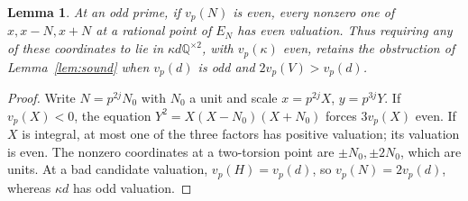 \documentclass[11pt]{article}
\newcommand{\Q}{\mathbb Q}
\newcommand{\vp}{v_p}
\newtheorem{lemma}[theorem]{Lemma}
\theoremstyle{remark}\newtheorem{remark}[theorem]{Remark}
\begin{document}
\begin{lemma}\label{lem:shifts}
At an odd prime, if \(\vp(N)\) is even, every nonzero one of
\(x,x-N,x+N\) at a rational point of \(E_N\) has even valuation.
Thus requiring any of these coordinates to lie in
\(\kappa d\Q^{\times2}\), with \(\vp(\kappa)\) even, retains the
obstruction of Lemma~\ref{lem:sound} when \(\vp(d)\) is odd and \(2\vp(V)>\vp(d)\).
\end{lemma}
\begin{proof}
Write \(N=p^{2j}N_0\) with \(N_0\) a unit and scale
\(x=p^{2j}X\), \(y=p^{3j}Y\). If \(\vp(X)<0\), the equation
\(Y^2=X(X-N_0)(X+N_0)\) forces \(3\vp(X)\) even.
If \(X\) is integral, at most one of the three factors has positive
valuation; its valuation is even. The nonzero coordinates at a
 two-torsion point are \(\pm N_0,\pm2N_0\), which are units.
At a bad candidate valuation, \(\vp(H)=\vp(d)\), so
\(\vp(N)=2\vp(d)\), whereas \(\kappa d\) has odd valuation.
\end{proof}
\end{document}
